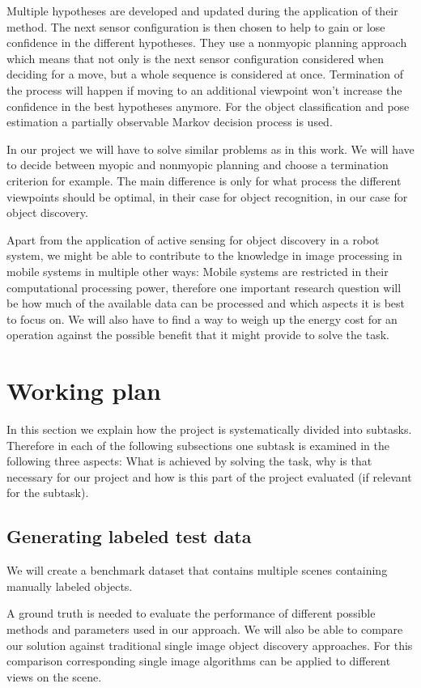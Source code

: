 \documentclass[a4paper,11pt,english]{article}
\begin{document}
Multiple hypotheses are developed and updated during the application of their method. The next sensor configuration is then chosen to help to gain or lose confidence in the different hypotheses.
They use a nonmyopic planning approach which means that not only is the next sensor configuration considered when deciding for a move, but a whole sequence is considered at once. 
Termination of the process will happen if moving to an additional viewpoint won't increase the confidence in the best hypotheses anymore.
For the object classification and pose estimation a partially observable Markov decision process is used.

In our project we will have to solve similar problems as in this work.
We will have to decide between myopic and nonmyopic planning and choose a termination criterion for example. The main difference is only for what process the different viewpoints should be optimal, in their case for object recognition, in our case for object discovery.\medskip

Apart from the application of active sensing for object discovery in a robot system, we might be able to contribute to the knowledge in image processing in mobile systems in multiple other ways:
Mobile systems are restricted in their computational processing power, therefore one important research question will be how much of the available data can be processed and which aspects it is best to focus on. 
We will also have to find a way to weigh up the energy cost for an operation against the possible benefit that it might provide to solve the task.

\section{Working plan}
In this section we explain how the project is systematically divided into subtasks.
Therefore in each of the following subsections one subtask is examined in the following three aspects: What is achieved by solving the task, why is that necessary for our project and how is this part of the project evaluated (if relevant for the subtask).

\subsection{Generating labeled test data}
We will create a benchmark dataset that contains multiple scenes containing manually labeled objects.

A ground truth is needed to evaluate the performance of different possible methods and parameters used in our approach. We will also be able to compare our solution against traditional single image object discovery approaches. For this comparison corresponding single image algorithms can be applied to different views on the scene.
\end{document}
